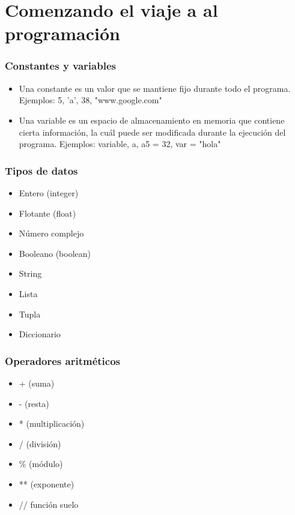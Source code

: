 \documentclass[hyperref={pdfpagelabels=false},xcolor=pst,pdf,fragile]{beamer}
\author{
  Luis, FirstName1
  \texttt{luis.last1@gmail.com}
  \and
  \\Carlos Rodríguez
  \texttt{carlosrdz.isd@gmail.com}
}
\title{\Title}
\date{\today}
\begin{document}
\maketitle



\section{Comenzando el viaje a al programación}
\begin{frame}
    \frametitle{Constantes y variables}
    \pause
    \begin{itemize}
    \item Una constante es un valor que se mantiene fijo durante todo el programa. 
    Ejemplos: 5, 'a', 38, "www.google.com"
    \item Una variable es un espacio de almacenamiento en memoria que contiene cierta información, la cuál puede ser modificada durante la ejecución del programa.
    Ejemplos: variable, a, a5 = 32, var = "hola"
    \end{itemize}
\end{frame}

\begin{frame}
    \frametitle{Tipos de datos}
    \pause
    \begin{itemize}
    \item Entero (integer)
    \item Flotante (float)
    \item Número complejo
    \item Booleano (boolean)
    \item String
    \item Lista
    \item Tupla
    \item Diccionario
    \end{itemize}
\end{frame}

\begin{frame}
    \frametitle{Operadores aritméticos}
    \pause
    \begin{itemize}
    \item + (suma)
    \item - (resta)
    \item * (multiplicación)
    \item / (división)
    \item \% (módulo)
    \item ** (exponente)
    \item // función suelo
    \end{itemize}
\end{frame}
\end{document}

